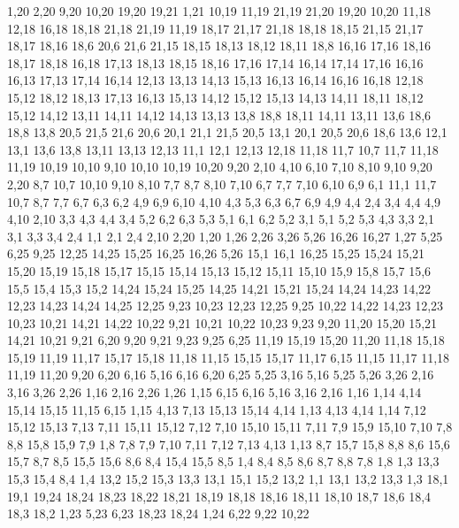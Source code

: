 %
1,20
2,20
9,20
10,20
19,20
19,21
1,21
%
10,19
11,19
21,19
21,20
19,20
10,20
%
11,18
12,18
16,18
18,18
21,18
21,19
11,19
%
18,17
21,17
21,18
18,18
%
18,15
21,15
21,17
18,17
18,16
%
18,6
20,6
21,6
21,15
18,15
18,13
18,12
18,11
18,8
%
16,16
17,16
18,16
18,17
18,18
16,18
%
17,13
18,13
18,15
18,16
17,16
17,14
%
16,14
17,14
17,16
16,16
%
16,13
17,13
17,14
16,14
%
12,13
13,13
14,13
15,13
16,13
16,14
16,16
16,18
12,18
%
15,12
18,12
18,13
17,13
16,13
15,13
%
14,12
15,12
15,13
14,13
%
14,11
18,11
18,12
15,12
14,12
%
13,11
14,11
14,12
14,13
13,13
%
13,8
18,8
18,11
14,11
13,11
%
13,6
18,6
18,8
13,8
%
20,5
21,5
21,6
20,6
%
20,1
21,1
21,5
20,5
%
13,1
20,1
20,5
20,6
18,6
13,6
%
12,1
13,1
13,6
13,8
13,11
13,13
12,13
%
11,1
12,1
12,13
12,18
11,18
11,7
%
10,7
11,7
11,18
11,19
10,19
10,10
%
9,10
10,10
10,19
10,20
9,20
%
2,10
4,10
6,10
7,10
8,10
9,10
9,20
2,20
%
8,7
10,7
10,10
9,10
8,10
%
7,7
8,7
8,10
7,10
%
6,7
7,7
7,10
6,10
6,9
%
6,1
11,1
11,7
10,7
8,7
7,7
6,7
6,3
6,2
%
4,9
6,9
6,10
4,10
%
4,3
5,3
6,3
6,7
6,9
4,9
4,4
%
2,4
3,4
4,4
4,9
4,10
2,10
%
3,3
4,3
4,4
3,4
%
5,2
6,2
6,3
5,3
%
5,1
6,1
6,2
5,2
%
3,1
5,1
5,2
5,3
4,3
3,3
%
2,1
3,1
3,3
3,4
2,4
%
1,1
2,1
2,4
2,10
2,20
1,20
1,26
2,26
3,26
5,26
16,26
16,27
1,27
%
5,25
6,25
9,25
12,25
14,25
15,25
16,25
16,26
5,26
%
15,1
16,1
16,25
15,25
15,24
15,21
15,20
15,19
15,18
15,17
15,15
15,14
15,13
15,12
15,11
15,10
15,9
15,8
15,7
15,6
15,5
15,4
15,3
15,2
%
14,24
15,24
15,25
14,25
%
14,21
15,21
15,24
14,24
14,23
14,22
%
12,23
14,23
14,24
14,25
12,25
%
9,23
10,23
12,23
12,25
9,25
%
10,22
14,22
14,23
12,23
10,23
%
10,21
14,21
14,22
10,22
%
9,21
10,21
10,22
10,23
9,23
%
9,20
11,20
15,20
15,21
14,21
10,21
9,21
%
6,20
9,20
9,21
9,23
9,25
6,25
%
11,19
15,19
15,20
11,20
%
11,18
15,18
15,19
11,19
%
11,17
15,17
15,18
11,18
%
11,15
15,15
15,17
11,17
%
6,15
11,15
11,17
11,18
11,19
11,20
9,20
6,20
6,16
%
5,16
6,16
6,20
6,25
5,25
%
3,16
5,16
5,25
5,26
3,26
%
2,16
3,16
3,26
2,26
%
1,16
2,16
2,26
1,26
%
1,15
6,15
6,16
5,16
3,16
2,16
1,16
%
1,14
4,14
15,14
15,15
11,15
6,15
1,15
%
4,13
7,13
15,13
15,14
4,14
%
1,13
4,13
4,14
1,14
%
7,12
15,12
15,13
7,13
%
7,11
15,11
15,12
7,12
%
7,10
15,10
15,11
7,11
%
7,9
15,9
15,10
7,10
%
7,8
8,8
15,8
15,9
7,9
%
1,8
7,8
7,9
7,10
7,11
7,12
7,13
4,13
1,13
%
8,7
15,7
15,8
8,8
%
8,6
15,6
15,7
8,7
%
8,5
15,5
15,6
8,6
%
8,4
15,4
15,5
8,5
%
1,4
8,4
8,5
8,6
8,7
8,8
7,8
1,8
%
1,3
13,3
15,3
15,4
8,4
1,4
%
13,2
15,2
15,3
13,3
%
13,1
15,1
15,2
13,2
%
1,1
13,1
13,2
13,3
1,3
18,1
19,1
19,24
18,24
18,23
18,22
18,21
18,19
18,18
18,16
18,11
18,10
18,7
18,6
18,4
18,3
18,2
%
1,23
5,23
6,23
18,23
18,24
1,24
%
6,22
9,22
10,22
